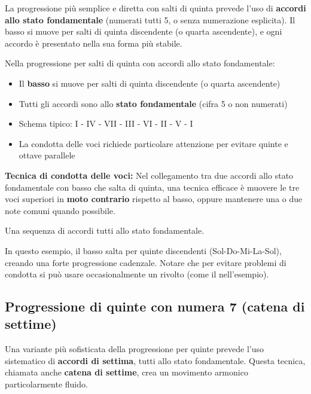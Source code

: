 La progressione più semplice e diretta con salti di quinta prevede l'uso di \textbf{accordi allo stato fondamentale} (numerati tutti 5, o senza numerazione esplicita). Il basso si muove per salti di quinta discendente (o quarta ascendente), e ogni accordo è presentato nella sua forma più stabile.

\begin{regola}
	\label{reg:progressione_5}
	Nella progressione per salti di quinta con accordi allo stato fondamentale:
	
	\begin{itemize}
		\item Il \textbf{basso} si muove per salti di quinta discendente (o quarta ascendente)
		\item Tutti gli accordi sono allo \textbf{stato fondamentale} (cifra 5 o non numerati)
		\item Schema tipico: I - IV - VII - III - VI - II - V - I
		\item La condotta delle voci richiede particolare attenzione per evitare quinte e ottave parallele
	\end{itemize}
	
	\textbf{Tecnica di condotta delle voci:}
	Nel collegamento tra due accordi allo stato fondamentale con basso che salta di quinta, una tecnica efficace è muovere le tre voci superiori in \textbf{moto contrario} rispetto al basso, oppure mantenere una o due note comuni quando possibile.
\end{regola}

\begin{esempio}
	\label{ex:progressione_5_sol}
	Una sequenza di accordi tutti allo stato fondamentale.
	
	In questo esempio, il basso salta per quinte discendenti (Sol-Do-Mi-La-Sol), creando una forte progressione cadenzale. Notare che per evitare problemi di condotta si può usare occasionalmente un rivolto (come il  nell'esempio).
\end{esempio}

\subsection{Progressione di quinte con numera 7 (catena di settime)}
\label{subsec:progressione_quinte_7}

Una variante più sofisticata della progressione per quinte prevede l'uso sistematico di \textbf{accordi di settima}, tutti allo stato fondamentale. Questa tecnica, chiamata anche \textbf{catena di settime}, crea un movimento armonico particolarmente fluido.

